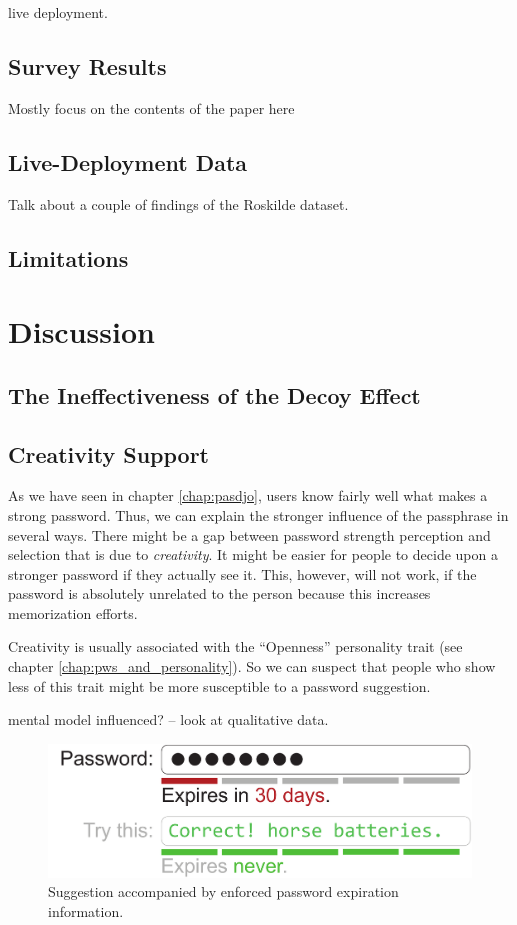 live deployment. 

\subsection{Survey Results}
Mostly focus on the contents of the paper here

\subsection{Live-Deployment Data}
Talk about a couple of findings of the Roskilde dataset. 

\subsection{Limitations}


\section{Discussion}

\subsection{The Ineffectiveness of the Decoy Effect}


\subsection{Creativity Support}
As we have seen in chapter \ref{chap:pasdjo}, users know fairly well what makes a strong password. Thus, we can explain the stronger influence of the passphrase in several ways. There might be a gap between password strength perception and selection that is due to \textit{creativity}. It might be easier for people to decide upon a stronger password if they actually see it. This, however, will not work, if the password is absolutely unrelated to the person because this increases memorization efforts. 

Creativity is usually associated with the ``Openness'' personality trait (see chapter \ref{chap:pws_and_personality}). So we can suspect that people who show less of this trait might be more susceptible to a password suggestion. 

mental model influenced? -- look at qualitative data. 


\begin{figure}
	\centering
	\includegraphics[width=0.7\linewidth]{figures/decoy/expire_mockup}
	\caption{\label{fig:decoy:expiremockup}Suggestion accompanied by enforced password expiration information.}
\end{figure}


